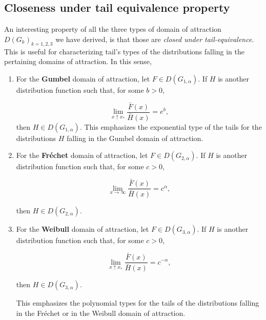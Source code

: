 \subsection{Closeness under tail equivalence property} An interesting property of all the three types of domain of attraction $D(G_{k})_{k=1,2,3}$ we have derived, is that those are \emph{closed under tail-equivalence}. This is useful for characterizing tail's types of the distributions falling in the pertaining domains of attraction. In this sense,

\begin{enumerate}
	\item For the \textbf{Gumbel} domain of attraction,  let $F\in D(G_{1,\alpha})$. If $H$ is another distribution function such that, for some $b>0$, 
	
	\begin{equation}
	\displaystyle{\lim_{ x \uparrow x_*}} \frac{\bar{F}(x)}{\bar{H}(x)}=e^{b},
	\end{equation}
	then $H\in D(G_{1,\alpha})$. This emphasizes the exponential type of the  tails for the distributions $H$ falling in the Gumbel domain of attraction.
	
	
	\item For the \textbf{Fréchet} domain of attraction, let $F\in D(G_{2,\alpha})$. If $H$ is another distribution function such that, for some $c>0$, 
	
	\begin{equation}
	\displaystyle{\lim_{ x \to\infty}} \frac{\bar{F}(x)}{\bar{H}(x)}=c^{\alpha},
	\end{equation}
	
	then $H\in D(G_{2,\alpha})$.
	
	\item For the \textbf{Weibull} domain of attraction,  let $F\in D(G_{3,\alpha})$. If $H$ is another distribution function such that, for some $c>0$, 
	
	\begin{equation}
	\displaystyle{\lim_{ x  \uparrow  x_*}} \frac{\bar{F}(x)}{\bar{H}(x)}=c^{-\alpha},
	\end{equation}
	
	then $H\in D(G_{3,\alpha})$.
	
	This emphasizes the polynomial types for the tails of the distributions falling in the Fréchet or in the Weibull domain of attraction.
\end{enumerate}



